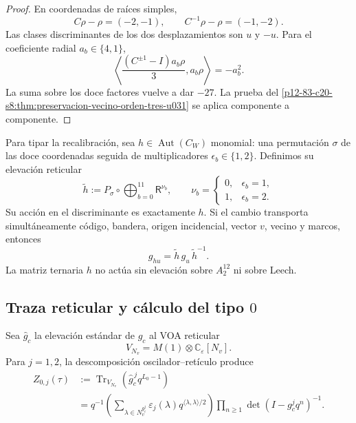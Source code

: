\begin{proof}
En coordenadas de raíces simples,
\[
 C\rho-\rho=(-2,-1),
 \qquad
 C^{-1}\rho-\rho=(-1,-2).
\]
Las clases discriminantes de los dos desplazamientos son \(u\) y \(-u\).
Para el coeficiente radial \(a_b\in\{4,1\}\),
\[
 \left\langle
 \frac{(C^{\pm1}-I)a_b\rho}{3},a_b\rho
 \right\rangle=-a_b^2.
\]
La suma sobre los doce factores vuelve a dar \(-27\). La prueba del
\cref{p12-83-c20-s8:thm:preservacion-vecino-orden-tres-u031} se aplica componente a
componente.
\end{proof}

Para tipar la recalibración, sea
\(h\in\operatorname{Aut}(C_W)\) monomial: una permutación \(\sigma\) de
las doce coordenadas seguida de multiplicadores
\(\epsilon_b\in\{1,2\}\). Definimos su elevación reticular
\begin{equation}
 \widetilde h
 :=P_\sigma\circ
 \bigoplus_{b=0}^{11}\mathsf R^{\nu_b},
 \qquad
 \nu_b=
 \begin{cases}
 0,&\epsilon_b=1,\\
 1,&\epsilon_b=2.
 \end{cases}
 \label{p12-83-c20-s8:eq:elevacion-monomial-u031}
\end{equation}
Su acción en el discriminante es exactamente \(h\). Si el cambio transporta
simultáneamente código, bandera, origen incidencial, vector \(v\), vecino y
marcos, entonces
\begin{equation}
 g_{hu}=\widetilde h\,g_u\,\widetilde h^{-1}.
 \label{p12-83-c20-s8:eq:naturalidad-isometrias-u031}
\end{equation}
La matriz ternaria \(h\) no actúa sin elevación sobre \(A_2^{12}\) ni sobre
Leech.

\subsection{Traza reticular y cálculo del tipo \(0\)}

Sea \(\widehat g_c\) la elevación estándar de \(g_c\) al VOA reticular
\[
 V_{N_v}=M(1)\otimes\mathbb C_\varepsilon[N_v].
\]
Para \(j=1,2\), la descomposición oscilador--retículo produce
\begin{equation}
 \begin{split}
 Z_{0,j}(\tau)
 &:=
 \operatorname{Tr}_{V_{N_v}}
 \left(\widehat g_c^{\,j}q^{L_0-1}\right)\\
 &=q^{-1}
 \left(
 \sum_{\lambda\in N_v^{g_c^j}}
 \varepsilon_j(\lambda)
 q^{\langle\lambda,\lambda\rangle/2}
 \right)
 \prod_{n\ge1}\det(I-g_c^jq^n)^{-1}.
 \end{split}
 \label{p12-83-c20-s8:eq:factorizacion-traza-reticular-u031}
\end{equation}

